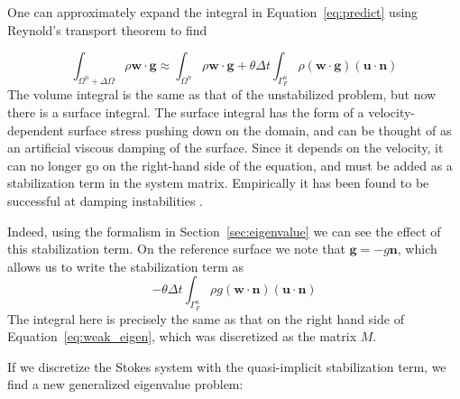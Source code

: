 \documentclass[preprint,12pt,authoryear]{elsarticle}
\begin{document}
One can approximately expand the integral in Equation~\eqref{eq:predict} using 
Reynold's transport theorem to find

\begin{equation}
\int_{\Omega^n + \Delta \Omega} \rho  \mathbf{w} \cdot \mathbf{g} \approx
\int_{\Omega^n} \rho  \mathbf{w} \cdot \mathbf{g} + \theta \Delta t \int_{\Gamma_F^n} \rho ( \mathbf{w \cdot g}) (\mathbf{u \cdot n} )
\label{eq:kmm}
\end{equation}
The volume integral is the same as that of the unstabilized problem, but now there is a surface integral.
The surface integral has the form of a velocity-dependent surface stress pushing down on the 
domain, and can be thought of as an artificial viscous damping of the surface.
Since it depends on the velocity, it can no longer go on the right-hand side of the 
equation, and must be added as a stabilization term in the system matrix.  
Empirically it has been found to be successful at damping instabilities \citep{kaus2010stabilization, quinquis2011role, duretz2011discretization}.

Indeed, using the formalism in Section~\ref{sec:eigenvalue} we can see the effect of this 
stabilization term. On the reference surface we note that $\mathbf{g} = -g \mathbf{n}$, which
allows us to write the stabilization term as
\begin{equation}
-\theta \Delta t \int_{\Gamma_F^n} \rho g ( \mathbf{w \cdot n}) (\mathbf{u \cdot n} )
\end{equation}
The integral here is precisely the same as that on the right hand side of Equation~\eqref{eq:weak_eigen}, which was discretized as the matrix $M$.

If we discretize the Stokes system with the quasi-implicit stabilization term, we find
a new generalized eigenvalue problem:
\end{document}
